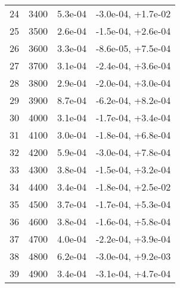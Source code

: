\begin{table}
\begin{adjustbox}{width=1\textwidth/2}
\begin{tabular}{|c|c|c|c|}
\cline{1-4}
24 & 3400 & 5.3e-04 & -3.0e-04, +1.7e-02 \\
\cline{1-4}
25 & 3500 & 2.6e-04 & -1.5e-04, +2.6e-04 \\
\cline{1-4}
26 & 3600 & 3.3e-04 & -8.6e-05, +7.5e-04 \\
\cline{1-4}
27 & 3700 & 3.1e-04 & -2.4e-04, +3.6e-04 \\
\cline{1-4}
28 & 3800 & 2.9e-04 & -2.0e-04, +3.0e-04 \\
\cline{1-4}
29 & 3900 & 8.7e-04 & -6.2e-04, +8.2e-04 \\
\cline{1-4}
30 & 4000 & 3.1e-04 & -1.7e-04, +3.4e-04 \\
\cline{1-4}
31 & 4100 & 3.0e-04 & -1.8e-04, +6.8e-04 \\
\cline{1-4}
32 & 4200 & 5.9e-04 & -3.0e-04, +7.8e-04 \\
\cline{1-4}
33 & 4300 & 3.8e-04 & -1.5e-04, +3.2e-04 \\
\cline{1-4}
34 & 4400 & 3.4e-04 & -1.8e-04, +2.5e-02 \\
\cline{1-4}
35 & 4500 & 3.7e-04 & -1.7e-04, +5.3e-04 \\
\cline{1-4}
36 & 4600 & 3.8e-04 & -1.6e-04, +5.8e-04 \\
\cline{1-4}
37 & 4700 & 4.0e-04 & -2.2e-04, +3.9e-04 \\
\cline{1-4}
38 & 4800 & 6.2e-04 & -3.0e-04, +9.2e-03 \\
\cline{1-4}
39 & 4900 & 3.4e-04 & -3.1e-04, +4.7e-04 \\
\cline{1-4}
\end{tabular}
\end{adjustbox}
\end{table}

